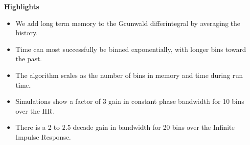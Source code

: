 \documentclass[12pt]{article}
\begin{document}
{\bf Highlights}
\begin{itemize}
\item We add long term memory to the Grunwald differintegral by averaging the history.
\item Time can most successfully be binned exponentially, with longer bins toward the past.
\item The algorithm scales as the number of bins in memory and time during run time. 
\item Simulations show a factor of 3 gain in constant phase bandwidth for 10 bins over the IIR.
\item There is a 2 to 2.5 decade gain in bandwidth for 20 bins over the Infinite Impulse Response.

\end{itemize}
\end{document}
